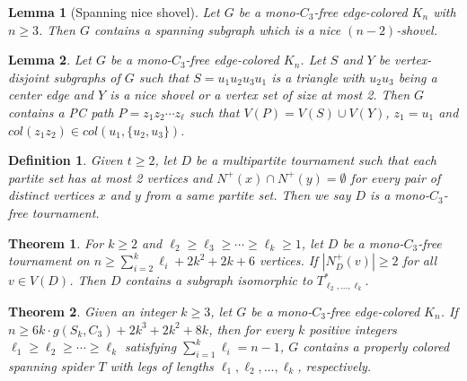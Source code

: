 \documentclass[10pt,a4paper]{amsart}
\newtheorem{theorem}{Theorem}
\newtheorem{lemma}{Lemma}
\newtheorem{definition}{Definition}
\begin{document}
\begin{lemma}[Spanning nice shovel]\label{Lem:SPANING}
     Let $G$ be a mono-$C_3$-free edge-colored $K_n$ with $n\geq 3$. Then $G$ contains a spanning subgraph which is a nice $(n-2)$-shovel.
\end{lemma}

\begin{lemma}\label{Lem:S AND Y}
Let $G$ be a mono-$C_3$-free edge-colored $K_n$. Let $S$ and $Y$ be vertex-disjoint subgraphs of $G$ such that $S=u_1u_2u_3u_1$ is a triangle with $u_2u_3$ being a center edge and $Y$ is a nice shovel or a vertex set of size at most 2. Then $G$ contains a PC path $P=z_1z_2\cdots z_\ell$ such that $V(P)=V(S)\cup V(Y)$, $z_1=u_1$ and $col(z_1z_2)\in col(u_1,\{u_2,u_3\})$.
\end{lemma}

\begin{definition}\label{def:monoC3-free-tournament}
    Given $t\geq 2$, let  $D$ be a multipartite tournament such that each partite set has at most 2 vertices and $N^+\left( x \right) \cap N^+\left( y \right) =\emptyset$ for every pair of distinct vertices $x$ and $y$ from a same partite set. Then we say $D$ is a {\it mono-$C_3$-free tournament}.
\end{definition}

\begin{theorem}\label{Thm:D-spider}
  For $k\ge 2$ and $\ell_2\geq \ell_3 \geq \cdots \geq \ell_k\geq 1$,  let $D$ be a mono-$C_3$-free tournament on $n\geq\sum^k_{i=2}{\ell_i}+2k^2+2k+6$ vertices. If $|N^+_D(v)|\geq 2$  for all $v\in V(D)$.  Then $D$ contains  a  subgraph isomorphic to   $T^*_{\ell_2,\ldots,\ell_k}$.
\end{theorem}

\begin{theorem}\label{Thm:k-spider}
     Given an integer $k\geq 3$, let $G$ be a mono-$C_3$-free edge-colored $K_n$. If $n\geq 6k\cdot g(S_k,C_3)+2k^3+2k^2+8k$,  then
    for every $k$ positive integers $\ell_1\geq \ell_2\geq \cdots\geq \ell_k$ satisfying $\sum_{i=1}^k \ell_i=n-1$, $G$ contains a properly colored spanning spider $T$ with legs of lengths $\ell_1,\ell_2,\ldots,\ell_k$, respectively.
\end{theorem}
\end{document}
